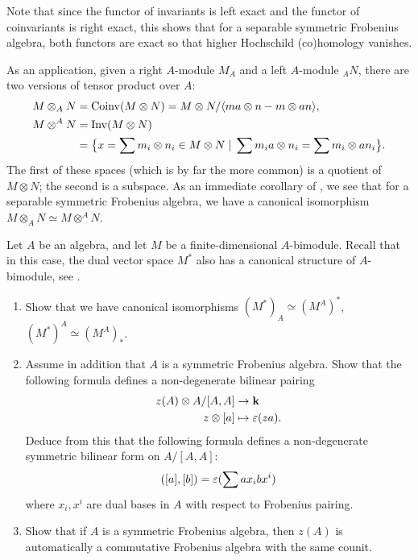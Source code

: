Note that since the functor of invariants is left exact and the functor of
coinvariants is right exact, this shows that for a separable symmetric Frobenius
algebra, both functors are exact so that higher Hochschild (co)homology vanishes.


As an application, given a right $A$-module $M_A$ and a left $A$-module
${}_A N$, there are two versions of tensor product over $A$:
\begin{equation}\label{e:tensor-types}
  \begin{aligned}
    M\otimes_A N &= \operatorname{Coinv} (M\otimes N) =
    M \otimes N/\langle ma\otimes n- m\otimes an\rangle,\\
    M\otimes^A N &=\operatorname{Inv}(M\otimes N) \\
    &=\bigl\{x=\sum m_i\otimes n_i\in M\otimes N
    \; | \; \sum m_ia\otimes n_i=\sum m_i\otimes an_i\bigr\}.
  \end{aligned}
\end{equation}
The first of these spaces (which is by far the more common) is a quotient of
$M\otimes N$; the second is a subspace. As an immediate corollary of
, we see that for a separable symmetric Frobenius
algebra, we have a canonical isomorphism $M \otimes_A N \simeq M\otimes^A
N$.


\begin{exercise}\label{ec:invariants-dual}
  Let $A$ be an algebra, and let $M$ be a finite-dimensional $A$-bimodule.
  Recall that in this case, the dual vector space $M^*$ also has a canonical
  structure of $A$-bimodule, see .
  \begin{enumerate}
    \item Show that we have canonical isomorphisms
      $(M^*)_A\simeq (M^A)^*$, $(M^*)^A\simeq (M^A)_*$.
    \item Assume in addition that $A$ is a symmetric Frobenius algebra.
      Show that the following formula defines a non-degenerate bilinear
      pairing
        \begin{align*}
          z(A)\otimes A/[A,A]&\to \mathbf{k}\\
           z\otimes [a]&\mapsto \varepsilon(za).
        \end{align*}
        Deduce from this that the following formula defines a non-degenerate
        symmetric bilinear form on $A/[A,A]$:
        $$
        ([a],[b])=\varepsilon(\sum ax_ibx^i)
        $$
        where $x_i, x^i$ are dual bases in $A$ with respect to Frobenius
        pairing.
    \item Show that if $A$ is a  symmetric Frobenius algebra, then $z(A)$ is
      automatically  a commutative Frobenius algebra with the same counit.
  \end{enumerate}
\end{exercise}

